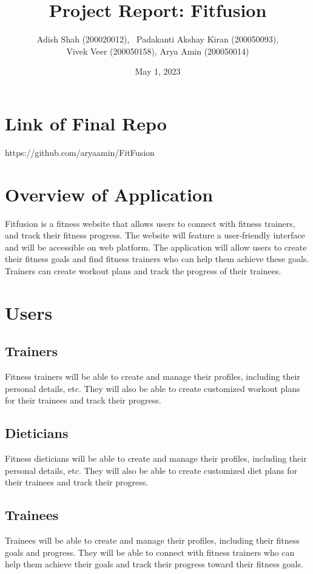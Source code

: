 \documentclass{article}
\title{\bf Project Report: Fitfusion}
\author{Adish Shah (200020012), \
Padakanti Akshay Kiran (200050093), \\ 
Vivek Veer (200050158), Arya Amin (200050014)}
\date{May 1, 2023}
\begin{document}
\maketitle

\section{Link of Final Repo}
https://github.com/aryaamin/FitFusion

\section{Overview of Application}
Fitfusion is a fitness website that allows users to connect with fitness trainers,  and track their fitness progress. The website will feature a user-friendly interface and will be accessible on web platform. The application will allow users to create their fitness goals and find fitness trainers who can help them achieve these goals. Trainers can create workout plans and track the progress of their trainees.

\section{Users}
\subsection{Trainers}
Fitness trainers will be able to create and manage their profiles, including their personal details, etc. They will also be able to create customized workout plans for their trainees and track their progress.

\subsection{Dieticians}
Fitness dieticians will be able to create and manage their profiles, including their personal details, etc. They will also be able to create customized diet plans for their trainees and track their progress.

\subsection{Trainees}
Trainees will be able to create and manage their profiles, including their fitness goals and progress. They will be able to connect with fitness trainers who can help them achieve their goals and track their progress toward their fitness goals.
\end{document}
